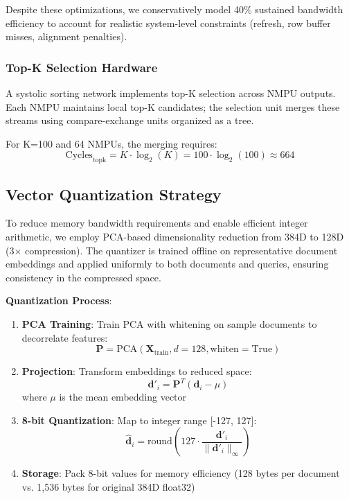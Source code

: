 \documentclass[conference]{IEEEtran}
\begin{document}
Despite these optimizations, we conservatively model 40\% sustained bandwidth efficiency to account for realistic system-level constraints (refresh, row buffer misses, alignment penalties).

\subsubsection{Top-K Selection Hardware}

A systolic sorting network implements top-K selection across NMPU outputs. Each NMPU maintains local top-K candidates; the selection unit merges these streams using compare-exchange units organized as a tree.

For K=100 and 64 NMPUs, the merging requires:
\begin{equation}
\text{Cycles}_{\text{topk}} = K \cdot \log_2(K) = 100 \cdot \log_2(100) \approx 664
\end{equation}

\subsection{Vector Quantization Strategy}

To reduce memory bandwidth requirements and enable efficient integer arithmetic, we employ PCA-based dimensionality reduction from 384D to 128D (3$\times$ compression). The quantizer is trained offline on representative document embeddings and applied uniformly to both documents and queries, ensuring consistency in the compressed space.

\textbf{Quantization Process}:
\begin{enumerate}
    \item \textbf{PCA Training}: Train PCA with whitening on sample documents to decorrelate features:
    \begin{equation}
    \mathbf{P} = \text{PCA}(\mathbf{X}_{\text{train}}, d=128, \text{whiten}=\text{True})
    \end{equation}

    \item \textbf{Projection}: Transform embeddings to reduced space:
    \begin{equation}
    \mathbf{d}'_i = \mathbf{P}^T (\mathbf{d}_i - \mu)
    \end{equation}
    where $\mu$ is the mean embedding vector

    \item \textbf{8-bit Quantization}: Map to integer range [-127, 127]:
    \begin{equation}
    \hat{\mathbf{d}}_i = \text{round}\left(127 \cdot \frac{\mathbf{d}'_i}{\|\mathbf{d}'_i\|_\infty}\right)
    \end{equation}

    \item \textbf{Storage}: Pack 8-bit values for memory efficiency (128 bytes per document vs. 1,536 bytes for original 384D float32)
\end{enumerate}
\end{document}
